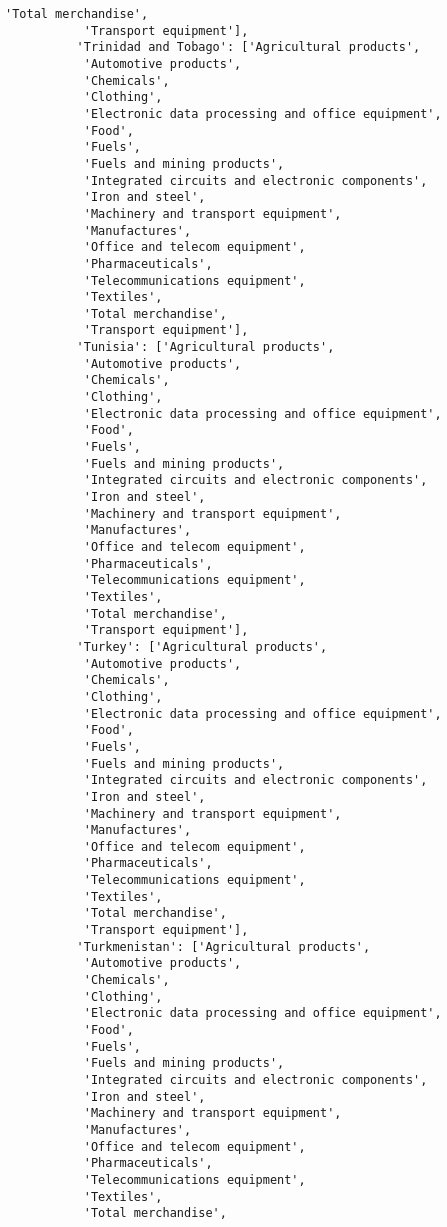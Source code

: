 \documentclass[11pt]{article}
\begin{document}
\begin{Verbatim}[commandchars=\\\{\}]
           'Total merchandise',
           'Transport equipment'],
          'Trinidad and Tobago': ['Agricultural products',
           'Automotive products',
           'Chemicals',
           'Clothing',
           'Electronic data processing and office equipment',
           'Food',
           'Fuels',
           'Fuels and mining products',
           'Integrated circuits and electronic components',
           'Iron and steel',
           'Machinery and transport equipment',
           'Manufactures',
           'Office and telecom equipment',
           'Pharmaceuticals',
           'Telecommunications equipment',
           'Textiles',
           'Total merchandise',
           'Transport equipment'],
          'Tunisia': ['Agricultural products',
           'Automotive products',
           'Chemicals',
           'Clothing',
           'Electronic data processing and office equipment',
           'Food',
           'Fuels',
           'Fuels and mining products',
           'Integrated circuits and electronic components',
           'Iron and steel',
           'Machinery and transport equipment',
           'Manufactures',
           'Office and telecom equipment',
           'Pharmaceuticals',
           'Telecommunications equipment',
           'Textiles',
           'Total merchandise',
           'Transport equipment'],
          'Turkey': ['Agricultural products',
           'Automotive products',
           'Chemicals',
           'Clothing',
           'Electronic data processing and office equipment',
           'Food',
           'Fuels',
           'Fuels and mining products',
           'Integrated circuits and electronic components',
           'Iron and steel',
           'Machinery and transport equipment',
           'Manufactures',
           'Office and telecom equipment',
           'Pharmaceuticals',
           'Telecommunications equipment',
           'Textiles',
           'Total merchandise',
           'Transport equipment'],
          'Turkmenistan': ['Agricultural products',
           'Automotive products',
           'Chemicals',
           'Clothing',
           'Electronic data processing and office equipment',
           'Food',
           'Fuels',
           'Fuels and mining products',
           'Integrated circuits and electronic components',
           'Iron and steel',
           'Machinery and transport equipment',
           'Manufactures',
           'Office and telecom equipment',
           'Pharmaceuticals',
           'Telecommunications equipment',
           'Textiles',
           'Total merchandise',

\end{Verbatim}
\end{document}
